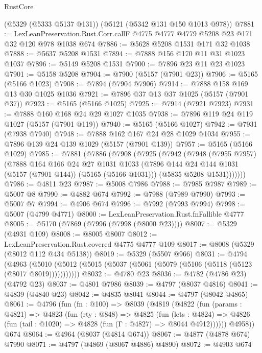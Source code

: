 \begin{lexlean}{RustCore}
\begin{coremodule}
    (@5329 (@5333 @5137 @131))
    (@5121 (@5342 @131 @150 @1013 @978))
@7881 := LexLeanPreservation.Rust.Corr.callF
    @4775
    @4777
    @4779
    @5208
    @23
    @171
    @32
    @120
    @978
    @1038
    @674
@7886 := @5628 @5208 @1531 @171 @32 @1038
@7888 := @5637 @5208 @1531
@7894 := @7888 @156 @170 @11 @31 @1023 @1037
@7896 := @5149 @5208 @1531
@7900 := @7896 @23 @11 @23 @1023
@7901 := @5158 @5208
@7904 := @7900 (@5157 (@7901 @23))
@7906 := @5165 (@5166 @1023)
@7908 := @7894 (@7904 @7906)
@7914 := @7888 @158 @169 @13 @30 @1025 @1036
@7921 := @7896 @37 @13 @37 @1025 (@5157 (@7901 @37))
@7923 := @5165 (@5166 @1025)
@7925 := @7914 (@7921 @7923)
@7931 := @7888 @160 @168 @24 @29 @1027 @1035
@7938 := @7896 @119 @24 @119 @1027 (@5157 (@7901 @119))
@7940 := @5165 (@5166 @1027)
@7942 := @7931 (@7938 @7940)
@7948 := @7888 @162 @167 @24 @28 @1029 @1034
@7955 := @7896 @139 @24 @139 @1029 (@5157 (@7901 @139))
@7957 := @5165 (@5166 @1029)
@7985 := @7881
    (@7886
      (@7908
        (@7925
          (@7942
            (@7948
              (@7955 @7957)
              (@7888
                @164
                @166
                @24
                @27
                @1031
                @1033
                (@7896 @144 @24 @144 @1031 (@5157 (@7901 @144)) (@5165 (@5166 @1031)))
                (@5835 @5208 @1531)))))))
@7986 := @4811 @23
@7987 := @5008 @7986
@7988 := @7985 @7987
@7989 := @5007 @8
@7990 := @4882 @674
@7992 := @7988 (@7989 @7990)
@7993 := @5007 @7
@7994 := @4906 @674
@7996 := @7992 (@7993 @7994)
@7998 := @5007 (@4799 @4771)
@8000 := LexLeanPreservation.Rust.fnFallible @4777
@8005 := @5170 (@7869 (@7996 (@7998 (@8000 @23))))
@8007 := @5329 (@4931 @109)
@8008 := @8005 @8007
@8012 := LexLeanPreservation.Rust.covered @4775 @4777 @109
@8017 := @8008 (@5329 (@8012 @112 @434 @5138))
@8019 := @5329 (@5507 @966)
@8031 := @4794
    (@4963 (@5010 (@5012 (@5015 (@5037 (@5061 (@5079 (@5106 (@5118 (@5123 (@8017 @8019)))))))))))
@8032 := @4780 @23
@8036 := @4782 (@4786 @23) (@4792 @23)
@8037 := @4801 @7986
@8039 := @4797 (@8037 @4816)
@8041 := @4839 (@4840 @23)
@8042 := @4835 @8041
@8044 := @4797 (@8042 @4865)
@8061 := @4796
    (fun (fn : @100) =>
    @8039
      (@4819
        (@4822
          (fun (params : @4821) =>
          @4823
            (fun (rty : @848) =>
            @4825
              (fun (lets : @4824) =>
              @4826 (fun (tail : @1020) => @4828 (fun (Γ : @4827) => @8044 @4912))))))
        @4958))
    @674
@8064 := @4964 (@8037 (@4814 @674))
@8067 := @4877 (@4878 @674) @7990
@8071 := @4797 (@4869 (@8067 @4886) @4890)
@8072 := @4903 @674

\end{coremodule}
\end{lexlean}
